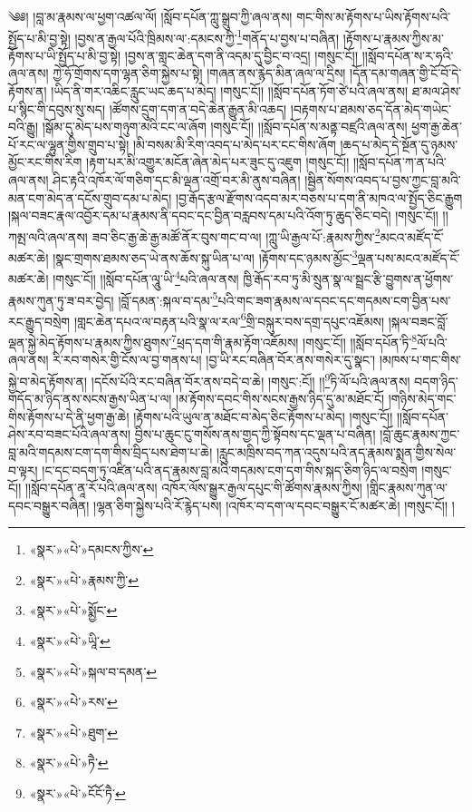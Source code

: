 ༄༅། །བླ་མ་རྣམས་ལ་ཕྱག་འཚལ་ལོ། །སློབ་དཔོན་ཀླུ་སྒྲུབ་ཀྱི་ཞལ་ནས། གང་གིས་མ་རྟོགས་པ་ཡིས་རྟོགས་པའི་སྤྱོད་པ་མི་བྱ་སྟེ། །བྱས་ན་རྒྱལ་པོའི་ཁྲིམས་ལ་:དམངས་ཀྱི་\footnote{«སྣར་»«པེ་»དམངས་ཀྱིས་}གནོད་པ་བྱས་པ་བཞིན། །རྟོགས་པ་རྣམས་ཀྱིས་མ་རྟོགས་པ་ཡི་སྤྱོད་པ་མི་བྱ་སྟེ། །བྱས་ན་གླང་ཆེན་དག་ནི་འདམ་དུ་བྱིང་བ་འདྲ། །གསུང་ངོ།། །།སློབ་དཔོན་ས་ར་ཧའི་ཞལ་ནས། ཀྱེ་ཧོ་གྲོགས་དག་ལྷན་ཅིག་སྐྱེས་པ་སྟེ། །གཞན་ནས་རྙེད་མིན་ཞལ་ལ་དྲིས། །དོན་དམ་གཞན་གྱི་ངོ་བོ་དེ་རྟོགས་ན། །ཡིད་ནི་གར་འཆིང་རླུང་ཡང་ཆད་པ་མེད། །གསུང་ངོ།། །།སློབ་དཔོན་ཏོག་ཙེ་པའི་ཞལ་ནས། ཐ་མལ་ཤེས་པ་སྙིང་གི་དབུས་སུ་སད། །ཚོགས་དྲུག་དག་ན་བདེ་ཆེན་རྒྱུན་མི་འཆད། །བརྟགས་པ་ཐམས་ཅད་དོན་མེད་གཡེང་བའི་རྒྱུ། །སྒོམ་དུ་མེད་པས་གཉུག་མའི་ངང་ལ་ཞོག །གསུང་ངོ།། །།སློབ་དཔོན་ས་མནྟ་བཛྲའི་ཞལ་ནས། ཕྱག་རྒྱ་ཆེན་པོ་རང་ལ་ལྷུན་གྱིས་གྲུབ་པ་སྟེ། །མི་བསམ་མི་རིག་འབད་པ་མེད་པར་ངང་གིས་ཞོག །ཆད་པ་མེད་དེ་སྔོན་དུ་ཉམས་མྱོང་རང་གིས་རིག །རྟག་པར་མི་འགྱུར་མངོན་ཞེན་མེད་པར་ཟུང་དུ་འཇུག །གསུང་ངོ།། །།སློབ་དཔོན་ཀ་ན་པའི་ཞལ་ནས། ཤིང་རྟའི་འཁོར་ལོ་གཅིག་དང་མི་ལྡན་འགྲོ་བར་མི་ནུས་བཞིན། །སྦྱིན་སོགས་འབད་པ་བྱས་ཀྱང་བླ་མའི་མན་ངག་མེད་ན་དངོས་གྲུབ་དམ་པ་མེད། །བྱ་རྒོད་རྩལ་རྫོགས་འདབ་མར་བཅས་པ་དག་ནི་མཁའ་ལ་སྤྱོད་ཅིང་རྒྱུག །སྐལ་བཟང་རྣལ་འབྱོར་དམ་པ་རྣམས་ནི་དབང་དང་བྱིན་བརླབས་དམ་པའི་འོག་ཏུ་ཆུད་ཅིང་བདེ། །གསུང་ངོ།། །།ཀམྤ་ལའི་ཞལ་ནས། ཟབ་ཅིང་རྒྱ་ཆེ་རྒྱ་མཚོ་ནོར་བུས་གང་བ་ལ། །ཀླུ་ཡི་རྒྱལ་པོ་:རྣམས་ཀྱིས་\footnote{«སྣར་»«པེ་»རྣམས་ཀྱི་}མངའ་མཛོད་ངོ་མཚར་ཆེ། །སྣང་གྲགས་ཐམས་ཅད་ཡེ་ནས་ཆོས་སྐུ་ཡིན་པ་ལ། །རྟོགས་དང་ཉམས་མྱོང་\footnote{«སྣར་»«པེ་»སྨྱོང་}ལྡན་པས་མངའ་མཛོད་ངོ་མཚར་ཆེ། །གསུང་ངོ།། །།སློབ་དཔོན་ལཱུ་ཡི་\footnote{«སྣར་»«པེ་»ཡཱི་}པའི་ཞལ་ནས། ཁྱི་རྒོད་རབ་ཏུ་མི་སྲུན་སྣ་ལ་སྦྲང་རྩི་བྱུགས་ན་ཕྱོགས་རྣམས་ཀུན་ཏུ་ཟ་བར་བྱེད། །བློ་དམན་:སྐལ་བ་དམ་\footnote{«སྣར་»«པེ་»སྐལ་བ་དམན་}པའི་གང་ཟག་རྣམས་ལ་དབང་དང་གདམས་ངག་བྱིན་པས་རང་རྒྱུད་བསྲེག །གླང་ཆེན་དཔའ་ལ་བརྟན་པའི་སྣ་ལ་རལ་\footnote{«སྣར་»«པེ་»རས་}གྲི་བསྐུར་བས་དགྲ་དཔུང་འཇོམས། །སྐལ་བཟང་བློ་ལྡན་སྐྱེ་མེད་རྟོགས་པ་རྣམས་ཀྱིས་ཐུགས་\footnote{«སྣར་»«པེ་»ཐུག་}ཕྲད་དག་གི་རྣམ་རྟོག་འཇོམས། །གསུང་ངོ།། །།སློབ་དཔོན་ཏི་\footnote{«སྣར་»«པེ་»ཏཻ་}ལོ་པའི་ཞལ་ནས། རི་རབ་གསེར་གྱི་ངོས་ལ་བྱ་གནས་པ། །བྱ་ཡི་རང་བཞིན་བོར་ནས་གསེར་དུ་སྣང་། །མཁས་པ་གང་གིས་སྐྱེ་བ་མེད་རྟོགས་ན། །དངོས་པོའི་རང་བཞིན་བོར་ནས་བདེ་བ་ཆེ། །གསུང་:ངོ།། །།\footnote{«སྣར་»«པེ་»ངོངོ་ཏཻ་}ཏི་ལོ་པའི་ཞལ་ནས། བདག་ཉིད་གདོད་མ་ཉིད་ནས་སངས་རྒྱས་ཡིན་པ་ལ། །མ་རྟོགས་དབང་གིས་སངས་རྒྱས་ཉིད་དུ་མ་མཐོང་ངོ། །གཉིས་མེད་གང་གིས་རྟོགས་པ་དེ་ནི་ཕྱག་རྒྱ་ཆེ། །རྟོགས་པའི་ཡུལ་ན་མཐོང་བ་མེད་ཅིང་རྟོགས་པ་མེད། །གསུང་ངོ།། །།སློབ་དཔོན་ཤེས་རབ་བཟང་པོའི་ཞལ་ནས། བྱིས་པ་ཆུང་ངུ་གསོས་ནས་གྱད་ཀྱི་སྟོབས་དང་ལྡན་པ་བཞིན། །བློ་ཆུང་རྣམས་ཀྱང་བླ་མའི་གདམས་ངག་དག་གིས་བྲིད་པས་ཐེག་པ་ཆེ། །རླུང་མཁྲིས་བད་ཀན་འདུས་པའི་ནད་རྣམས་སྨན་གྱིས་སེལ་བ་ལྟར། །ང་དང་བདག་ཏུ་འཛིན་པའི་ནད་རྣམས་བླ་མའི་གདམས་ངག་དག་གིས་སྐད་ཅིག་ཉིད་ལ་བསྲེག །གསུང་ངོ།། །།སློབ་དཔོན་ནཱ་རོ་པའི་ཞལ་ནས། འཁོར་ལོས་སྒྱུར་རྒྱལ་དཔུང་གི་ཚོགས་རྣམས་ཀྱིས། །གླིང་རྣམས་ཀུན་ལ་དབང་བསྒྱུར་བཞིན། །ལྷན་ཅིག་སྐྱེས་པའི་རོ་རྙེད་པས། །འཁོར་བ་དག་ལ་དབང་བསྒྱུར་ངོ་མཚར་ཆེ། །གསུང་ངོ།། །
